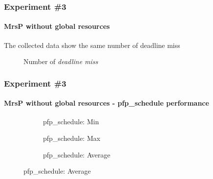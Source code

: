 \begin{frame}
	\frametitle{Experiment \#3}
	\framesubtitle{MrsP without global resources}

	The collected data show the same number of deadline miss

	\begin{figure}
    \scalebox{0.8}{\miss}
    \caption{Number of \textit{deadline miss}} %
	\end{figure}

\end{frame}

\begin{frame}

	\frametitle{Experiment \#3}
	\framesubtitle{MrsP without global resources - pfp\_schedule performance}

	\begin{figure}[htb]
	    \centering
	      \begin{subfigure}[b]{0.49\textwidth}
	        \centering
	        \resizebox{\linewidth}{!}\graficoSchedMIN  
	        \caption{pfp\_schedule: Min}
	      \end{subfigure}
	      \begin{subfigure}[b]{0.49\textwidth}
	        \centering
	        \resizebox{\linewidth}{!}\graficoSchedMAX
	        \caption{pfp\_schedule: Max}
	      \end{subfigure}
	      \begin{subfigure}[b]{0.49\textwidth}
	        \centering
	        \resizebox{\linewidth}{!}\graficoSchedAVG
	        \caption{pfp\_schedule: Average}
	      \end{subfigure}
	  \end{figure}

  \end{frame}